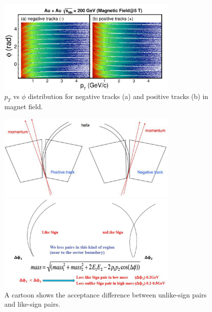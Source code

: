 \begin{figure}
\begin{centering}
\includegraphics[width=0.8\textwidth]{fig/3.Analysis/Additional/paper_phiAcc_star}
\par\end{centering}

\protect\caption{$p_{T}$ vs $\phi$ distribution for negative tracks (a) and positive
tracks (b) in magnet field.}


\label{fig:pmaccTPC}

\end{figure}


\begin{figure}
\begin{centering}
\includegraphics[width=0.8\textwidth]{fig/3.Analysis/background/Acc1}
\par\end{centering}

\begin{centering}
\includegraphics[width=0.8\textwidth]{fig/3.Analysis/background/Acc2}
\par\end{centering}

\protect\caption{A cartoon shows the acceptance difference between unlike-sign pairs
and like-sign pairs.}


\label{fig:accdiff}

\end{figure}


